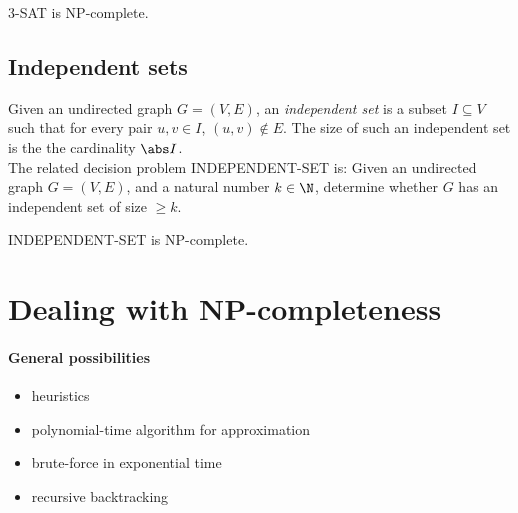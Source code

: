\documentclass{article}
\begin{document}
\begin{theorem}
	3-SAT is NP-complete.
\end{theorem}

\subsection{Independent sets}

\begin{definition}
	Given an undirected graph $G=(V,E)$, an \emph{independent set} is
	a subset $I\subseteq V$ such that for every pair $u,v\in I$,
	$(u,v)\not\in E$. The size of such an independent set is the
	the cardinality $\abs I$.\\
	The related decision problem INDEPENDENT-SET is: Given an undirected graph $G=(V,E)$,
	and a natural number $k\in\N$, determine whether $G$ has an independent
	set of size $\geq k$.
\end{definition}

\begin{proposition}
	INDEPENDENT-SET is NP-complete.
\end{proposition}


\section{Dealing with NP-completeness}


\paragraph{General possibilities}
\begin{itemize}
	\item heuristics
	\item polynomial-time algorithm for approximation
	\item brute-force in exponential time
	\item recursive backtracking
\end{itemize}
\end{document}

